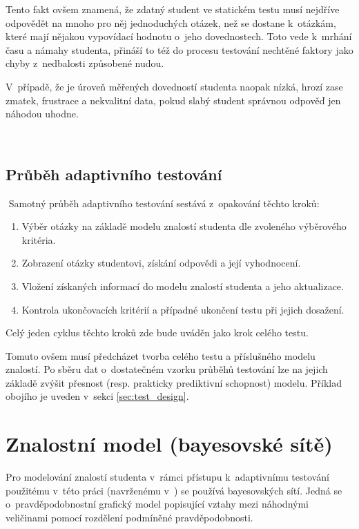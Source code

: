 \documentclass[a4paper,twoside,12pt]{scrbook}
\begin{document}
Tento fakt ovšem znamená, že zdatný student ve statickém testu musí nejdříve odpovědět na mnoho pro něj jednoduchých otázek, než se dostane k~otázkám, které mají nějakou vypovídací hodnotu o~jeho dovednostech. Toto vede k~mrhání času a námahy studenta, přináší to též do procesu testování nechtěné faktory jako chyby z~nedbalosti způsobené nudou.

V~případě, že je úroveň měřených dovedností studenta naopak nízká, hrozí zase zmatek, frustrace a nekvalitní data, pokud slabý student správnou odpověď jen náhodou uhodne.

 \subsection{Průběh adaptivního testování}
 Samotný průběh adaptivního testování sestává z~opakování těchto kroků: \cite{plajner16}
\begin{enumerate}
	\item Výběr otázky na základě modelu znalostí studenta dle zvoleného výběrového kritéria.
	\item Zobrazení otázky studentovi, získání odpovědi a její vyhodnocení.
	\item Vložení získaných informací do modelu znalostí studenta a jeho aktualizace.
	\item Kontrola ukončovacích kritérií a případné ukončení testu při jejich dosažení.
\end{enumerate}
Celý jeden cyklus těchto kroků zde bude uváděn jako krok celého testu.

Tomuto ovšem musí předcházet tvorba celého testu a příslušného modelu znalostí. Po sběru dat o~dostatečném vzorku průběhů testování lze na jejich základě zvýšit přesnost (resp. prakticky prediktivní schopnost) modelu. Příklad obojího je uveden v~sekci \ref{sec:test_design}. %
%



\section{Znalostní model (bayesovské sítě)}
Pro modelování znalostí studenta v~rámci přístupu k~adaptivnímu testování použitému v~této práci (navrženému v~\cite{almond_tlustospis}) se používá bayesovských sítí. Jedná se o~pravděpodobnostní grafický model popisující vztahy mezi náhodnými veličinami pomocí rozdělení podmíněné pravděpodobnosti.
\end{document}
